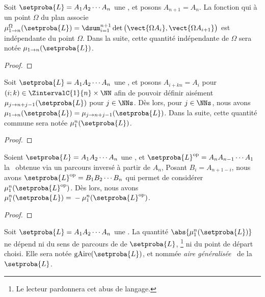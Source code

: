	


\begin{fact}
	Soit $\setproba{L} = A_1 A_2 \cdots A_n$ une \nline, et posons $A_{n+1} = A_n$.
	La fonction qui à un point $\Omega$ du plan associe 
	$\mu_{1 \to n}^\Omega (\setproba{L}) = \dsum_{i=1}^{n+1} \det \big( \vect{\Omega A_i} , \vect{\Omega A_{i+1}} \big)$ est indépendante du point $\Omega$.
	Dans la suite, cette quantité indépendante de $\Omega$ sera notée $\mu_{1 \to n} (\setproba{L})$.
\end{fact}


\begin{proof}
\end{proof}
	
	


\begin{fact}
	Soit $\setproba{L} = A_1 A_2 \cdots A_n$ une \nline, et posons $A_{i + kn} = A_i$ pour $(i;k) \in \ZintervalC{1}{n} \times \NN$ afin de pouvoir définir aisément $\mu_{j \to n+j-1} (\setproba{L})$ pour $j \in \NNs$.
	Dès lors, pour $j \in \NNs$, nous avons
	$\mu_{1 \to n} (\setproba{L}) = \mu_{j \to n+j-1} (\setproba{L})$.
	Dans la suite, cette quantité commune sera notée $\mu_1^n (\setproba{L})$.
\end{fact}


\begin{proof}
\end{proof}
	
	


\begin{fact}
	Soient 
	$\setproba{L} = A_1 A_2 \cdots A_n$ une \nline, et 
	$\setproba{L}^{\mathrm{op}} = A_n A_{n-1} \cdots A_1$ la \nline\ obtenue via un parcours inversé à partir de $A_n$, 
	Posant $B_i = A_{n + 1 - i}$, nous avons $\setproba{L}^{\mathrm{op}} = B_1 B_2 \cdots B_n$ qui permet de considérer $\mu_1^n (\setproba{L}^{\mathrm{op}})$.
	Dès lors, nous avons
	$\mu_1^n (\setproba{L}) = {} - \mu_1^n (\setproba{L}^{\mathrm{op}})$.
\end{fact}


\begin{proof}
\end{proof}
	
	


\begin{fact}
	Soit 
	$\setproba{L} = A_1 A_2 \cdots A_n$ une \nline.
	La quantité $\abs{\mu_1^n (\setproba{L})}$ ne dépend ni du sens de parcours de de $\setproba{L}$,%
	\footnote{
		Le lecteur pardonnera cet abus de langage.
	}
	ni du point de départ choisi.
	Elle sera notée $\garea{\setproba{L}}$, et nommée \og \emph{aire généralisée} \fg\ de la \nline\ $\setproba{L}$.
\end{fact}


